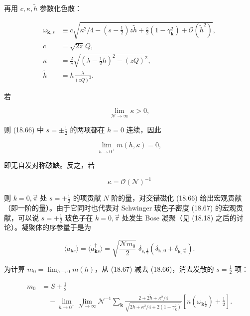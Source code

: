 再用 $c, \kappa, \tilde{h}$ 参数化色散：

\begin{align*}
\omega_{\mathbf {k}, s} & \equiv c \sqrt { \kappa^ {2} /4 - \left( s - \frac {1}{2} \right) z \tilde {h} + \frac {z}{2} \left( 1 - \gamma_{\mathbf {k}} ^ {2} \right) + \mathcal {O} ( \tilde {h} ^ {2} ) } ,\\
c & = \sqrt {2 z} \, Q ,\\
\kappa & = \frac {2}{c} \sqrt { \left( \lambda - \frac {1}{2} h \right) ^ {2} - \left( z Q \right) ^ {2} } ,\\
\tilde {h} & = h \frac {\lambda}{\left( z Q \right) ^ {2}} .
\tag{18.68}
\end{align*}

若

\begin{equation*}
\lim_{\mathcal {N} \to \infty} \kappa > 0 ,
\tag{18.69}
\end{equation*}

则 (18.66) 中 $s = \pm \frac{1}{2}$ 的两项都在 $h = 0$ 连续，因此

\begin{equation*}
\lim_{h \to 0 ^ {+}} m ( h, \kappa ) = 0 ,
\tag{18.70}
\end{equation*}

即无自发对称破缺。反之，若

\begin{equation*}
\kappa = \mathcal {O} ( \mathcal {N} ) ^ {- 1}
\tag{18.71}
\end{equation*}

则 $k = 0, \vec{\pi}$ 处 $s = +\frac{1}{2}$ 的项贡献 $N$ 阶的量，对交错磁化 (18.66) 给出宏观贡献（即一阶的量）。由于它同时也代表对 Schwinger 玻色子密度 (18.67) 的宏观贡献，可以说 $s = +\frac{1}{2}$ 玻色子在 $k = 0, \vec{\pi}$ 处发生 Bose 凝聚（见 (18.18) 之后的讨论）。凝聚体的序参量于是为

\begin{equation*}
\langle a _ {\mathbf {k} s} \rangle = \langle a _ {\mathbf {k} s} ^ {\dagger} \rangle = \sqrt {\frac {\mathcal {N} m _ {0}}{2}} \; \delta_{s, \frac {1}{2}} \left( \delta_{\mathbf {k}, 0} + \delta_{\mathbf {k}, \vec {\pi}} \right).
\tag{18.72}
\end{equation*}

为计算 $m_0 = \lim_{h\to 0}m(h)$，从 (18.67) 减去 (18.66)，消去发散的 $s = \frac{1}{2}$ 项：

\begin{align*}
m _ {0} & = S + \frac {1}{2}\\
& \quad - \lim_{h \to 0 ^ {+}} \lim_{\mathcal {N} \to \infty} \mathcal {N} ^ {- 1} \sum_ {\mathbf {k}} \frac {2 + 2 \tilde {h} + \kappa^ {2} /4}{\sqrt {2 \tilde {h} + \kappa^ {2} /4 + 2 \left( 1 - \gamma_{\mathbf {k}} ^ {2} \right) }} \left[ n \left( \omega_{\mathbf {k} \frac {1}{2}} \right) + \frac {1}{2} \right].
\tag{18.73}
\end{align*}

